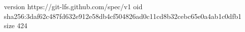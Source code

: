 version https://git-lfs.github.com/spec/v1
oid sha256:3daf62c487fd632e912e58db4cf504826ad0c11cd8b32cebc65e0a4ab1c0dfb1
size 424
